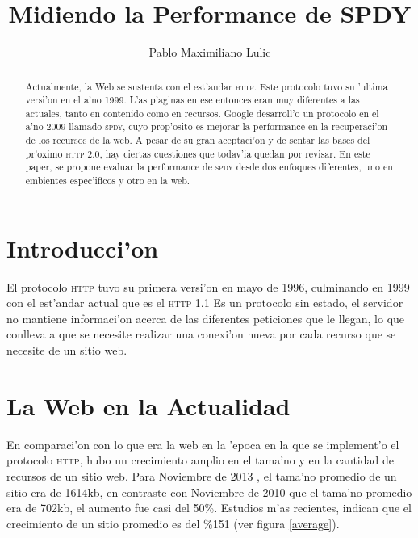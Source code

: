 \documentclass[a4paper,11pt,twocolumn]{article}
\begin{document}
\setlength{\columnsep}{25pt}

\title{Midiendo la Performance de SPDY}
\author{Pablo Maximiliano Lulic}

\maketitle

\begin{abstract} 
Actualmente, la Web se sustenta con el est'andar \textsc{http}. Este protocolo tuvo su 'ultima versi'on en el a'no 1999. L'as p'aginas en ese entonces eran muy diferentes a las actuales, tanto en contenido como en recursos. Google desarroll'o un protocolo en el a'no 2009 llamado \textsc{spdy}, cuyo prop'osito es mejorar la performance en la recuperaci'on de los recursos de la web. A pesar de su gran aceptaci'on y de sentar las bases del pr'oximo \textsc{http 2.0}, hay ciertas cuestiones que todav'ia quedan por revisar. En este paper, se propone evaluar la performance de \textsc{spdy} desde dos enfoques diferentes, uno en embientes espec'ificos y otro en la web.
\end{abstract}

\section{Introducci'on}

El protocolo \textsc{http} tuvo su primera versi'on en mayo de 1996, culminando en 1999 con el est'andar actual que es el \textsc{http}  1.1 \cite{rfcHTTP} Es un protocolo sin estado, el servidor no mantiene informaci'on acerca de las diferentes peticiones que le llegan, lo que conlleva a que se necesite realizar una conexi'on nueva por cada recurso que se necesite de un sitio web.

\section{La Web en la Actualidad}

En comparaci'on con lo que era la web en la 'epoca en la que se implement'o el protocolo \textsc{http}, hubo un crecimiento amplio en el tama'no y en la cantidad de recursos de un sitio web. Para Noviembre de 2013 \cite{httpArchive}, el tama'no promedio de un sitio era de 1614kb, en contraste con Noviembre de 2010 que el tama'no promedio era de 702kb, el aumento fue casi del 50\%. Estudios m'as recientes, indican que el crecimiento de un sitio promedio es del \%151 \cite{tammy} (ver figura \ref{average}).
\end{document}
